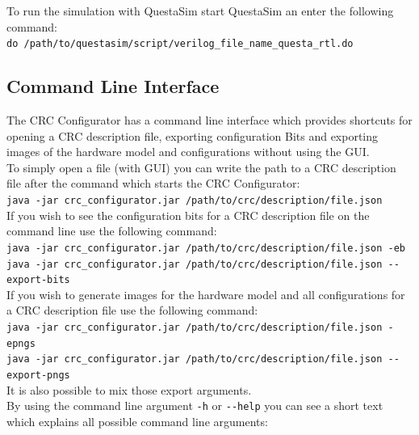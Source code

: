 \documentclass{article}
\begin{document}
To run the simulation with QuestaSim start QuestaSim an enter the following command:\\

\noindent\texttt{do /path/to/questasim/script/verilog\_file\_name\_questa\_rtl.do}

\subsection*{Command Line Interface}
The CRC Configurator has a command line interface which provides shortcuts for opening a CRC description file, exporting configuration Bits and exporting images of the hardware model and configurations without using the GUI.\\
To simply open a file (with GUI) you can write the path to a CRC description file after the command which starts the CRC Configurator:
\\

\noindent\texttt{java -jar crc\_configurator.jar /path/to/crc/description/file.json}\\

If you wish to see the configuration bits for a CRC description file on the command line use the following command:\\

\noindent\texttt{java -jar crc\_configurator.jar /path/to/crc/description/file.json -eb}\\
\noindent\texttt{java -jar crc\_configurator.jar /path/to/crc/description/file.json -{}-export-bits}\\

If you wish to generate images for the hardware model and all configurations for a CRC description file use the following command:\\

\noindent\texttt{java -jar crc\_configurator.jar /path/to/crc/description/file.json -epngs}\\
\noindent\texttt{java -jar crc\_configurator.jar /path/to/crc/description/file.json -{}-export-pngs}\\

It is also possible to mix those export arguments.\\
By using the command line argument \texttt{-h} or \texttt{-{}-help} you can see a short text which explains all possible command line arguments:
\end{document}

